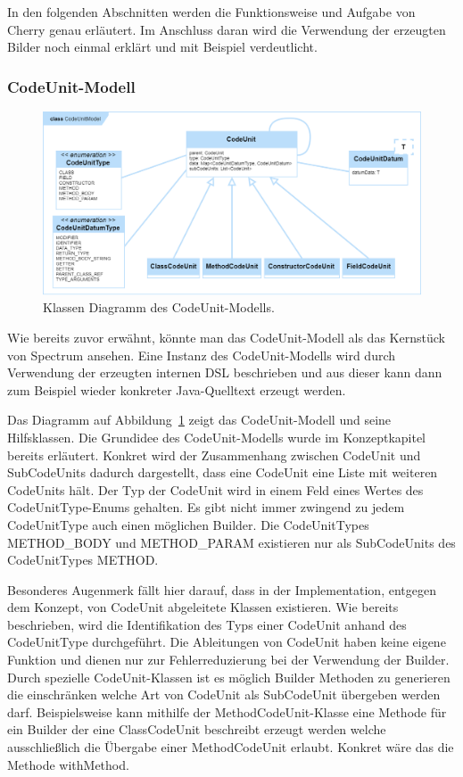 \documentclass[12pt,oneside,a4paper,parskip]{scrbook}
\begin{document}
In den folgenden Abschnitten werden die Funktionsweise und Aufgabe von Cherry genau erläutert. Im Anschluss daran wird die Verwendung der erzeugten Bilder noch einmal erklärt und mit Beispiel verdeutlicht.

\subsubsection{CodeUnit-Modell}

\begin{figure}[htbp]
	\centering
	\includegraphics[width=1.0\textwidth]{bilder/classCu}
	\caption{Klassen Diagramm des CodeUnit-Modells.}
	\label{fig:classcu}
\end{figure}

Wie bereits zuvor erwähnt, könnte man das CodeUnit-Modell als das Kernstück von Spectrum ansehen. Eine Instanz des CodeUnit-Modells wird durch Verwendung der erzeugten internen DSL beschrieben und aus dieser kann dann zum Beispiel wieder konkreter Java-Quelltext erzeugt werden.

Das Diagramm auf Abbildung~\ref{fig:classcu} zeigt das CodeUnit-Modell und seine Hilfsklassen.
Die Grundidee des CodeUnit-Modells wurde im Konzeptkapitel bereits erläutert. Konkret wird der Zusammenhang zwischen CodeUnit und SubCodeUnits dadurch dargestellt, dass eine CodeUnit eine Liste mit weiteren CodeUnits hält. Der Typ der CodeUnit wird in einem Feld eines Wertes des CodeUnitType-Enums gehalten. Es gibt nicht immer zwingend zu jedem CodeUnitType auch einen möglichen Builder. Die CodeUnitTypes METHOD\_BODY und METHOD\_PARAM existieren nur als SubCodeUnits des CodeUnitTypes METHOD.

Besonderes Augenmerk fällt hier darauf, dass in der Implementation, entgegen dem Konzept, von CodeUnit abgeleitete Klassen existieren. Wie bereits beschrieben, wird die Identifikation des Typs einer CodeUnit anhand des CodeUnitType durchgeführt. Die Ableitungen von CodeUnit haben keine eigene Funktion und dienen nur zur Fehlerreduzierung bei der Verwendung der Builder. Durch spezielle CodeUnit-Klassen ist es möglich Builder Methoden zu generieren die einschränken welche Art von CodeUnit als SubCodeUnit übergeben werden darf. Beispielsweise kann mithilfe der MethodCodeUnit-Klasse eine Methode für ein Builder der eine ClassCodeUnit beschreibt erzeugt werden welche ausschließlich die Übergabe einer MethodCodeUnit erlaubt. Konkret wäre das die Methode withMethod.
\end{document}
